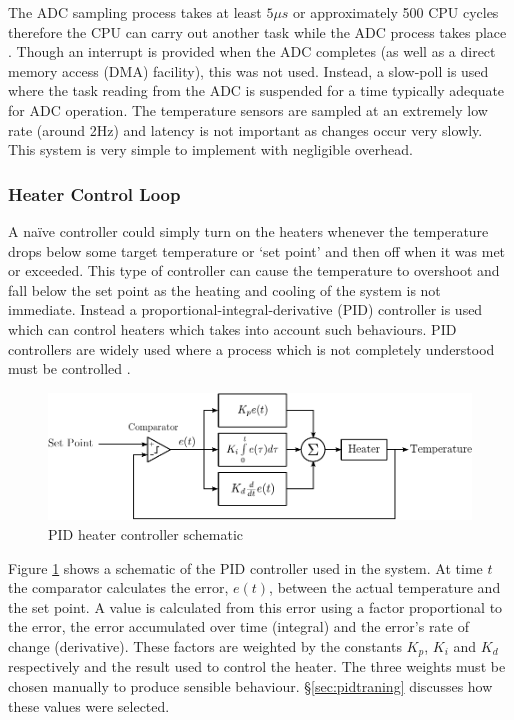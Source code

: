 				The ADC sampling process takes at least $5\mu{}s$ or approximately 500
				CPU cycles therefore the CPU can carry out another task while the ADC
				process takes place \cite{lpc1768}. Though an interrupt is provided when
				the ADC completes (as well as a direct memory access (DMA) facility),
				this was not used. Instead, a slow-poll is used where the task reading
				from the ADC is suspended for a time typically adequate for ADC
				operation. The temperature sensors are sampled at an extremely low rate
				(around 2Hz) and latency is not important as changes occur very slowly.
				This system is very simple to implement with negligible overhead.
			
			\subsubsection{Heater Control Loop}
				
				A na\"{i}ve controller could simply turn on the heaters whenever the
				temperature drops below some target temperature or `set point' and then
				off when it was met or exceeded. This type of controller can cause the
				temperature to overshoot and fall below the set point as the heating and
				cooling of the system is not immediate. Instead a
				proportional-integral-derivative (PID) controller is used which can
				control heaters which takes into account such behaviours. PID
				controllers are widely used where a process which is not completely
				understood must be controlled \cite{controleng}.
				
				\begin{figure}
					\includegraphics[width=1\textwidth]{diagrams/pid.pdf}
					\caption{PID heater controller schematic}
					\label{fig:pid}
				\end{figure}
				
				Figure \ref{fig:pid} shows a schematic of the PID controller used in the
				system. At time $t$ the comparator calculates the error, $e(t)$, between
				the actual temperature and the set point. A value is calculated from
				this error using a factor proportional to the error, the error
				accumulated over time (integral) and the error's rate of change
				(derivative). These factors are weighted by the constants $K_p$, $K_i$
				and $K_d$ respectively and the result used to control the heater. The
				three weights must be chosen manually to produce sensible behaviour.
				\S\ref{sec:pidtraning} discusses how these values were selected.
				
